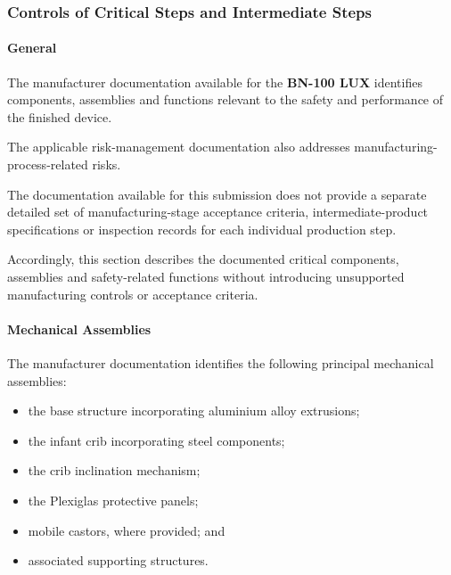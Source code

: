 ﻿

\hypertarget{p3-3-2-4}{}

\subsubsection{Controls of Critical Steps and Intermediate Steps}

\paragraph{General}

The manufacturer documentation available for the
\textbf{BN-100 LUX} identifies components, assemblies and functions
relevant to the safety and performance of the finished device.

The applicable risk-management documentation also addresses
manufacturing-process-related risks.

The documentation available for this submission does not provide a
separate detailed set of manufacturing-stage acceptance criteria,
intermediate-product specifications or inspection records for each
individual production step.

Accordingly, this section describes the documented critical
components, assemblies and safety-related functions without
introducing unsupported manufacturing controls or acceptance
criteria.


\paragraph{Mechanical Assemblies}

The manufacturer documentation identifies the following principal
mechanical assemblies:

\begin{itemize}
    \item the base structure incorporating aluminium alloy
    extrusions;
    \item the infant crib incorporating steel components;
    \item the crib inclination mechanism;
    \item the Plexiglas protective panels;
    \item mobile castors, where provided; and
    \item associated supporting structures.
\end{itemize}

